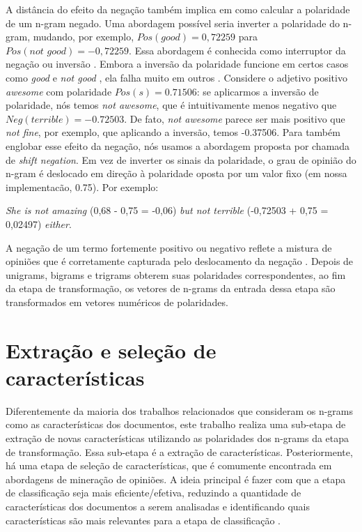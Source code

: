 \documentclass[template.tex]{subfiles}
\begin{document}
A distância do efeito da negação também implica em como calcular a polaridade de um n-gram negado.  Uma abordagem possível seria inverter a polaridade do n-gram, mudando, por exemplo, $Pos(\textit{good}) = 0,72259$ para $Pos(\textit{not good}) = - 0,72259$. Essa abordagem é conhecida como interruptor da negação ou inversão \cite{sauri2008factuality}. Embora a inversão da polaridade funcione em certos casos como \textit{good} e \textit{not good} \cite{choi2008learning}, ela falha muito em outros \cite{liu2009review}. Considere o adjetivo positivo \textit{awesome} com polaridade $Pos(s) = 0.71506 $: se aplicarmos a inversão de polaridade, nós temos \textit{not awesome}, que é intuitivamente menos negativo que $Neg(\textit{terrible}) = -0.72503$. De fato, \textit{not awesome} parece ser mais positivo que \textit{not fine}, por exemplo, que aplicando a inversão, temos -0.37506. Para também englobar esse efeito da negação, nós usamos a abordagem proposta por  chamada de \textit{shift negation}. Em vez de inverter os sinais da polaridade, o grau de opinião do n-gram é deslocado em direção à polaridade oposta por um valor fixo (em nossa implementacão, 0.75). Por exemplo:

\begin{example}
\textit{She is not amazing} (0,68 - 0,75 = -0,06) \textit{but not terrible} (-0,72503 + 0,75 = 0,02497) \textit{either}.
\label{ex:shift_1}
\end{example}

A negação de um termo fortemente positivo ou negativo reflete a mistura de opiniões que é corretamente capturada pelo deslocamento da negação \cite{taboada2011lexicon}. Depois de unigrams, bigrams e trigrams obterem suas polaridades correspondentes, ao fim da etapa de transformação, os vetores de n-grams da entrada dessa etapa são transformados em vetores numéricos de polaridades.  

\section{Extração e seleção de características}

Diferentemente da maioria dos trabalhos relacionados que consideram os n-grams como as características dos documentos, este trabalho realiza uma sub-etapa de extração de novas características utilizando as polaridades dos n-grams da etapa de transformação. Essa sub-etapa é a extração de características. Posteriormente, há uma etapa de seleção de características, que é comumente encontrada em abordagens de mineração de opiniões. A ideia principal é fazer com que a etapa de classificação seja mais eficiente/efetiva, reduzindo a quantidade de características dos documentos a serem analisadas e identificando quais características são mais relevantes para a etapa de classificação \cite{moraes2012document}. 
\end{document}
